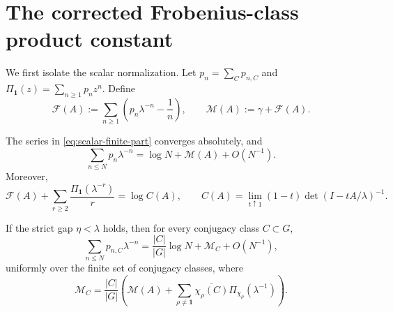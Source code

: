 \section{The corrected Frobenius-class product constant}
\label{sec:product-correction}

We first isolate the scalar normalization.  Let
\(p_n=\sum_Cp_{n,C}\) and
\(\Pi_{\mathbf1}(z)=\sum_{n\geq1}p_nz^n\).  Define
\begin{equation}\label{eq:scalar-finite-part}
  \mathcal F(A):=
  \sum_{n\geq1}\left(p_n\lambda^{-n}-\frac1n\right),
  \qquad
  \mathcal M(A):=\gamma+\mathcal F(A).
\end{equation}

\begin{lemma}\label{lem:class-mertens}
The series in \eqref{eq:scalar-finite-part} converges absolutely, and
\begin{equation}\label{eq:scalar-mertens}
  \sum_{n\leq N}p_n\lambda^{-n}
  =\log N+\mathcal M(A)+O(N^{-1}).
\end{equation}
Moreover,
\begin{equation}\label{eq:scalar-c-relation}
  \mathcal F(A)+
  \sum_{r\geq2}\frac{\Pi_{\mathbf1}(\lambda^{-r})}{r}
  =\log C(A),
  \qquad
  C(A)=\lim_{t\uparrow1}(1-t)\det(I-tA/\lambda)^{-1}.
\end{equation}

If the strict gap \(\eta<\lambda\) holds, then for every conjugacy class
\(C\subset G\),
\begin{equation}\label{eq:class-mertens}
  \sum_{n\leq N}p_{n,C}\lambda^{-n}
  =\frac{|C|}{|G|}\log N+\mathcal M_C+O(N^{-1}),
\end{equation}
uniformly over the finite set of conjugacy classes, where
\begin{equation}\label{eq:class-mertens-constant}
  \mathcal M_C=
  \frac{|C|}{|G|}\left(
    \mathcal M(A)+
    \sum_{\rho\neq\mathbf1}
       \overline{\chi_\rho(C)}\Pi_{\chi_\rho}(\lambda^{-1})
  \right).
\end{equation}
\end{lemma}

